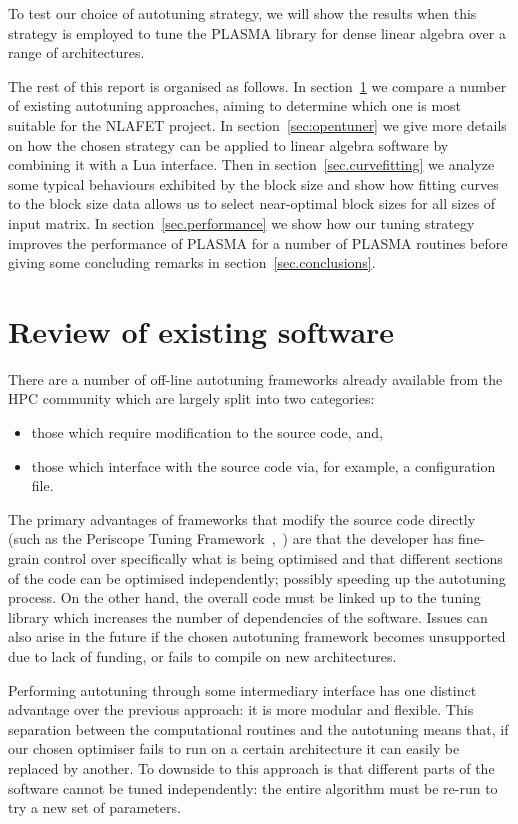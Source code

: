\documentclass[a4paper,12pt]{article}
\begin{document}
To test our choice of autotuning strategy,
we will show the results when this strategy is employed to tune
the PLASMA library for dense linear algebra over a range of architectures.

The rest of this report is organised as follows.
In section~\ref{sec.review} we compare a number of existing
autotuning approaches,
aiming to determine which one is most suitable
for the NLAFET project.
In section~\ref{sec:opentuner} we give more details
on how the chosen strategy can be applied to linear algebra software
by combining it with a Lua interface.
Then in section~\ref{sec.curvefitting} we analyze some typical
behaviours exhibited by the block size and show how fitting curves
to the block size data allows us to select near-optimal block sizes
for all sizes of input matrix.
In section~\ref{sec.performance} we show how our
tuning strategy improves the performance of PLASMA for
a number of PLASMA routines before giving some concluding remarks in
section~\ref{sec.conclusions}.

\section{Review of existing software}
\label{sec.review}
There are a number of off-line autotuning frameworks already
available from the HPC community
which are largely split into two categories:
\begin{itemize}
\item those which require modification to the source code, and,
\item those which interface with the source code via, for example,
  a configuration file.
\end{itemize}

The primary advantages of frameworks that modify the
source code directly
(such as the
Periscope Tuning Framework~\cite{mice13},~\cite{ptf14})
are that the developer has fine-grain control over specifically what
is being optimised and that different sections of the code can be
optimised independently;
possibly speeding up the autotuning process.
On the other hand,
the overall code must be linked up to the tuning library which
increases the number of dependencies of the software.
Issues can also arise in the future if the chosen
autotuning framework becomes unsupported due to lack of funding,
or fails to compile on new architectures.

Performing autotuning through some intermediary interface
has one distinct advantage over the previous approach:
it is more modular and flexible.
This separation between the computational routines and the
autotuning means that,
if our chosen optimiser fails to run on a certain architecture
it can easily be replaced by another.
To downside to this approach is that different parts of the software
cannot be tuned independently:
the entire algorithm must be re-run to try a new set of parameters.
\end{document}
